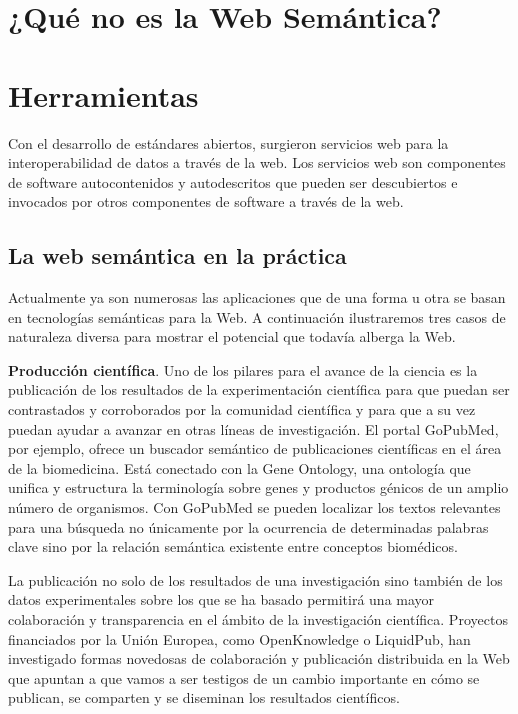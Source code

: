 \section{¿Qué no es la Web Semántica?}


\section{Herramientas}


Con el desarrollo de estándares abiertos, surgieron servicios web para la interoperabilidad de datos a través de la web. Los servicios web son componentes de software autocontenidos y autodescritos que pueden ser descubiertos e invocados por otros componentes de software a través de la web.

\subsection{La web semántica en la práctica}

Actualmente ya son numerosas las aplicaciones que de una forma u otra se basan en tecnologías semánticas para la Web. A continuación ilustraremos tres casos de naturaleza diversa para mostrar el potencial que todavía alberga la Web.

\textbf{Producción científica}. Uno de los pilares para el avance de la ciencia es la publicación de los resultados de la experimentación científica para que puedan ser contrastados y corroborados por la comunidad científica y para que a su vez puedan ayudar a avanzar en otras líneas de investigación. El portal GoPubMed, por ejemplo, ofrece un buscador semántico de publicaciones científicas en el área de la biomedicina. Está conectado con la Gene Ontology, una ontología que unifica y estructura la terminología sobre genes y productos génicos de un amplio número de organismos. Con GoPubMed se pueden localizar los textos relevantes para una búsqueda no únicamente por la ocurrencia de determinadas palabras clave sino por la relación semántica existente entre conceptos biomédicos. 

La publicación no solo de los resultados de una investigación sino también de los datos experimentales sobre los que se ha basado permitirá una mayor colaboración y transparencia en el ámbito de la investigación científica. Proyectos financiados por la Unión Europea, como OpenKnowledge o LiquidPub, han investigado formas novedosas de colaboración y publicación distribuida en la Web que apuntan a que vamos a ser testigos de un cambio importante en cómo se publican, se comparten y se diseminan los resultados científicos.

